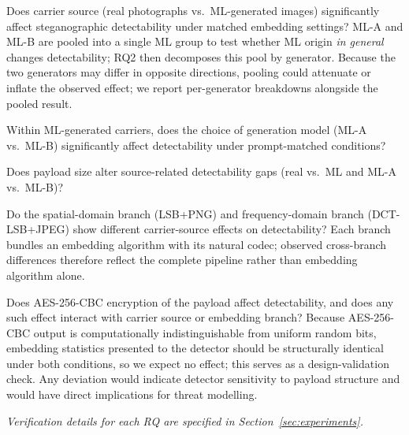 \documentclass[10pt,twocolumn,a4paper]{article}
\begin{document}
\begin{description}[font=\normalfont\bfseries,leftmargin=1em,style=nextline]

\item[RQ1: Primary (Carrier Source, Real vs.\ ML)] Does carrier source (real photographs vs.\ ML-generated images) significantly affect steganographic detectability under matched embedding settings? ML-A and ML-B are pooled into a single ML group to test whether ML origin \emph{in general} changes detectability; RQ2 then decomposes this pool by generator. Because the two generators may differ in opposite directions, pooling could attenuate or inflate the observed effect; we report per-generator breakdowns alongside the pooled result.

\item[RQ2: Primary (Generation-Model Effect Within ML)] Within ML-generated carriers, does the choice of generation model (ML-A vs.\ ML-B) significantly affect detectability under prompt-matched conditions?

\item[RQ3: Exploratory (Payload Interaction)] Does payload size alter source-related detectability gaps (real vs.\ ML and ML-A vs.\ ML-B)?

\item[RQ4: Exploratory (Embedding Branch)] Do the spatial-domain branch (LSB+PNG) and frequency-domain branch (DCT-LSB+JPEG) show different carrier-source effects on detectability? Each branch bundles an embedding algorithm with its natural codec; observed cross-branch differences therefore reflect the complete pipeline rather than embedding algorithm alone.

\item[RQ5: Verification (Encryption Invariance)] Does AES-256-CBC encryption of the payload affect detectability, and does any such effect interact with carrier source or embedding branch? Because AES-256-CBC output is computationally indistinguishable from uniform random bits, embedding statistics presented to the detector should be structurally identical under both conditions, so we expect no effect; this serves as a design-validation check. Any deviation would indicate detector sensitivity to payload structure and would have direct implications for threat modelling.

\end{description}
\noindent\textcolor{umgray}{\footnotesize\textit{Verification details for each RQ are specified in Section~\ref{sec:experiments}.}}
\end{document}
